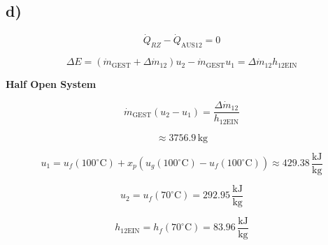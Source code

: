 

\subsection*{d)}
\[
\dot{Q}_{RZ} - \dot{Q}_{\text{AUS12}} = 0
\]

\[
\Delta E = \left( \dot{m}_{\text{GEST}} + \Delta \dot{m}_{12} \right) u_2 - \dot{m}_{\text{GEST}} u_1 = \Delta \dot{m}_{12} h_{\text{12EIN}}
\]

\textbf{Half Open System}

\[
\dot{m}_{\text{GEST}} (u_2 - u_1) = \frac{\Delta \dot{m}_{12}}{h_{\text{12EIN}}}
\]

\[
\approx 3756.9 \, \text{kg}
\]

\[
u_1 = u_f(100^\circ \text{C}) + x_p \left( u_g(100^\circ \text{C}) - u_f(100^\circ \text{C}) \right) \approx 429.38 \, \frac{\text{kJ}}{\text{kg}}
\]

\[
u_2 = u_f(70^\circ \text{C}) = 292.95 \, \frac{\text{kJ}}{\text{kg}}
\]

\[
h_{\text{12EIN}} = h_f(70^\circ \text{C}) = 83.96 \, \frac{\text{kJ}}{\text{kg}}
\]